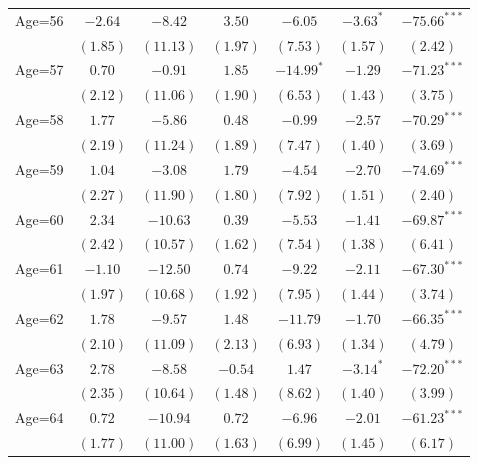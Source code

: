 \documentclass[fullpage]{paper}
\begin{document}
\begin{center}
\begin{longtable}{l c c c c c c }
Age=56      & $-2.64$      & $-8.42$      & $3.50$       & $-6.05$       & $-3.63^{*}$   & $-75.66^{***}$ \\
            & $(1.85)$     & $(11.13)$    & $(1.97)$     & $(7.53)$      & $(1.57)$      & $(2.42)$       \\
Age=57      & $0.70$       & $-0.91$      & $1.85$       & $-14.99^{*}$  & $-1.29$       & $-71.23^{***}$ \\
            & $(2.12)$     & $(11.06)$    & $(1.90)$     & $(6.53)$      & $(1.43)$      & $(3.75)$       \\
Age=58      & $1.77$       & $-5.86$      & $0.48$       & $-0.99$       & $-2.57$       & $-70.29^{***}$ \\
            & $(2.19)$     & $(11.24)$    & $(1.89)$     & $(7.47)$      & $(1.40)$      & $(3.69)$       \\
Age=59      & $1.04$       & $-3.08$      & $1.79$       & $-4.54$       & $-2.70$       & $-74.69^{***}$ \\
            & $(2.27)$     & $(11.90)$    & $(1.80)$     & $(7.92)$      & $(1.51)$      & $(2.40)$       \\
Age=60      & $2.34$       & $-10.63$     & $0.39$       & $-5.53$       & $-1.41$       & $-69.87^{***}$ \\
            & $(2.42)$     & $(10.57)$    & $(1.62)$     & $(7.54)$      & $(1.38)$      & $(6.41)$       \\
Age=61      & $-1.10$      & $-12.50$     & $0.74$       & $-9.22$       & $-2.11$       & $-67.30^{***}$ \\
            & $(1.97)$     & $(10.68)$    & $(1.92)$     & $(7.95)$      & $(1.44)$      & $(3.74)$       \\
Age=62      & $1.78$       & $-9.57$      & $1.48$       & $-11.79$      & $-1.70$       & $-66.35^{***}$ \\
            & $(2.10)$     & $(11.09)$    & $(2.13)$     & $(6.93)$      & $(1.34)$      & $(4.79)$       \\
Age=63      & $2.78$       & $-8.58$      & $-0.54$      & $1.47$        & $-3.14^{*}$   & $-72.20^{***}$ \\
            & $(2.35)$     & $(10.64)$    & $(1.48)$     & $(8.62)$      & $(1.40)$      & $(3.99)$       \\
Age=64      & $0.72$       & $-10.94$     & $0.72$       & $-6.96$       & $-2.01$       & $-61.23^{***}$ \\
            & $(1.77)$     & $(11.00)$    & $(1.63)$     & $(6.99)$      & $(1.45)$      & $(6.17)$       \\

\end{longtable}
\end{center}
\end{document}
